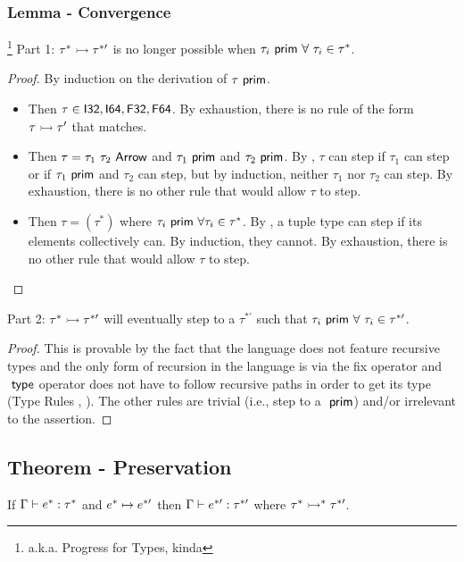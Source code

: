 \documentclass{article}
\begin{document}
\subsubsection{Lemma - Convergence}\footnote{a.k.a. Progress for Types, kinda}
Part 1: $\tau^* \rightarrowtail \tau^{*\prime}$ is no longer possible when $\tau_i ~\mathsf{prim} ~ \forall~ \tau_i \in \tau^*$.
\begin{proof}
By induction on the derivation of $\tau ~\mathsf{prim}$.

\begin{itemize}
    \item {}
        Then $\tau \in {\ensuremath{\mathsf{I32}}, \ensuremath{\mathsf{I64}}, \ensuremath{\mathsf{F32}}, \ensuremath{\mathsf{F64}}}$.
        By exhaustion, there is no rule of the form $\tau \rightarrowtail \tau'$ that matches.

    \item {}
        Then $\tau = \tau_1 ~ \tau_2 ~ \mathsf{Arrow}$ and $\tau_1 ~\mathsf{prim}$ and $\tau_2 ~\mathsf{prim}$.
        By , $\tau$ can step if $\tau_1$ can step or if $\tau_1 ~\mathsf{prim}$ and $\tau_2$ can step, but by induction, neither $\tau_1$ nor $\tau_2$ can step.
        By exhaustion, there is no other rule that would allow $\tau$ to step.

    \item {}
        Then $\tau = (\tau^*)$ where $\tau_i ~\mathsf{prim} ~ \forall \tau_i \in \tau^*$.
        By , a tuple type can step if its elements collectively can.
        By induction, they cannot.
        By exhaustion, there is no other rule that would allow $\tau$ to step.
\end{itemize}
\end{proof}
Part 2: $\tau^* \rightarrowtail \tau^{*\prime}$ will eventually step to a $\tau^{*\prime}$ such that $\tau_i ~\mathsf{prim} ~ \forall~ \tau_i \in \tau^{*\prime}$.
\begin{proof}
This is provable by the fact that the language does not feature recursive types and the only form of recursion in the language is via the fix operator and $~ \mathsf{type}$ operator does not have to follow recursive paths in order to get its type (Type Rules , ). The other rules are trivial (i.e., step to a $~\mathsf{prim}$) and/or irrelevant to the assertion.
\end{proof}


\subsection{Theorem - Preservation}
If $\Gamma \vdash e^* : \tau^*$ and $e^* \mapsto e^{*\prime}$ then $\Gamma \vdash e^{*\prime} : \tau^{*\prime}$ where $\tau^* \rightarrowtail^* \tau^{*\prime}$.
\end{document}
